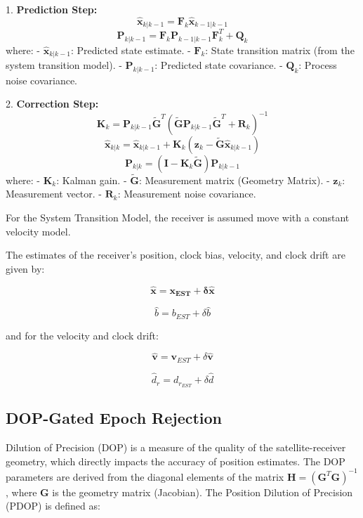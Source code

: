 \documentclass[conference]{IEEEtran}
\begin{document}
1. \textbf{Prediction Step:}
   \[
   \hat{\mathbf{x}}_{k|k-1} = \mathbf{F}_k \hat{\mathbf{x}}_{k-1|k-1}
   \]
   \[
   \mathbf{P}_{k|k-1} = \mathbf{F}_k \mathbf{P}_{k-1|k-1} \mathbf{F}_k^T + \mathbf{Q}_k
   \]
   where:
   - \(\hat{\mathbf{x}}_{k|k-1}\): Predicted state estimate.
   - \(\mathbf{F}_k\): State transition matrix (from the system transition model).
   - \(\mathbf{P}_{k|k-1}\): Predicted state covariance.
   - \(\mathbf{Q}_k\): Process noise covariance.

2. \textbf{Correction Step:}
   \[
   \mathbf{K}_k = \mathbf{P}_{k|k-1} \tilde{\mathbf{G}}^T (\tilde{\mathbf{G}} \mathbf{P}_{k|k-1} \tilde{\mathbf{G}}^T + \mathbf{R}_k)^{-1}
   \]
   \[
   \hat{\mathbf{x}}_{k|k} = \hat{\mathbf{x}}_{k|k-1} + \mathbf{K}_k (\mathbf{z}_k - \tilde{\mathbf{G}} \hat{\mathbf{x}}_{k|k-1})
   \]
   \[
   \mathbf{P}_{k|k} = (\mathbf{I} - \mathbf{K}_k \tilde{\mathbf{G}}) \mathbf{P}_{k|k-1}
   \]
   where:
   - \(\mathbf{K}_k\): Kalman gain.
   - \(\tilde{\mathbf{G}}\): Measurement matrix (Geometry Matrix).
   - \(\mathbf{z}_k\): Measurement vector.
   - \(\mathbf{R}_k\): Measurement noise covariance.

For the System Transition Model, the receiver is assumed move with a constant velocity model.

The estimates of the receiver’s position, clock bias, velocity, and clock drift are given by:

\begin{equation}
\mathbf{\hat{x}} = \mathbf{x_{EST}} + \mathbf{\delta\hat{x}}
\end{equation}

\begin{equation}
\hat{b} = b_{EST} + \delta\hat{b}
\end{equation}

and for the velocity and clock drift:

\begin{equation}
\hat{\mathbf{v}} = \mathbf{v}_{EST} + \delta\hat{\mathbf{v}}
\end{equation}

\begin{equation}
\hat{d}_r = d_{r_{EST}} + \delta\hat{d}
\end{equation}

\subsection*{DOP-Gated Epoch Rejection}

Dilution of Precision (DOP) is a measure of the quality of the satellite-receiver geometry, which directly impacts the accuracy of position estimates. The DOP parameters are derived from the diagonal elements of the matrix \( \mathbf{H} = (\mathbf{G}^T \mathbf{G})^{-1} \), where \( \mathbf{G} \) is the geometry matrix (Jacobian). The Position Dilution of Precision (PDOP) is defined as:
\end{document}
